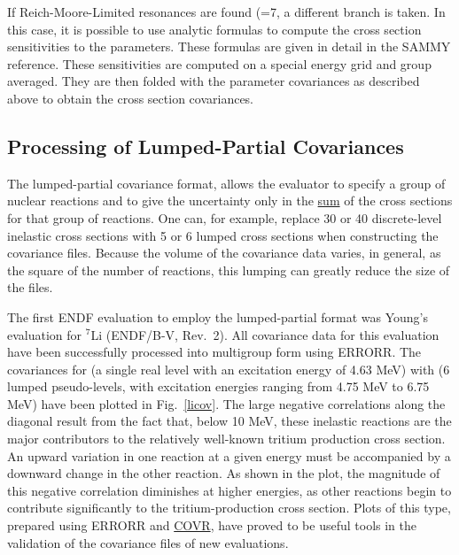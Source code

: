 If Reich-Moore-Limited resonances
are found (=7, a different branch is taken.  In this case,
it is possible to use analytic formulas to compute the cross section
sensitivities to the parameters.  These formulas are given in detail
in the SAMMY reference\cite{SAMMY}.  These sensitivities are computed
on a special energy grid and group averaged.  They are then folded
with the parameter covariances as described above to obtain the
cross section covariances.


\subsection{Processing of Lumped-Partial Covariances}
\label{ssERRORR_Lump}

The lumped-partial covariance format, allows the evaluator to
specify a group of nuclear reactions and to give the uncertainty only
in the \underline{sum} of the cross sections for that group of
reactions.  One can, for example, replace 30 or 40 discrete-level
inelastic cross sections with 5 or 6 lumped cross sections when
constructing the covariance files.  Because the volume of the
covariance data varies, in general, as the square of the number of
reactions, this lumping can greatly reduce the size of the files.

The first ENDF evaluation to employ the lumped-partial format was
Young's evaluation\cite{Young-2,Young} for $^7$Li (ENDF/B-V, Rev.~2).
All covariance data for this evaluation have been successfully
processed into multigroup form using ERRORR.  The covariances for
 (a single real level with an excitation energy of
4.63 MeV) with  (6 lumped pseudo-levels, with excitation
energies ranging from 4.75 MeV to 6.75 MeV) have been plotted in
Fig.~\ref{licov}.  The large negative correlations along the diagonal
result from the fact that, below 10 MeV, these inelastic reactions are
the major contributors to the relatively well-known tritium production
cross section.  An upward variation in one reaction at a given energy
must be accompanied by a downward change in the other reaction.  As shown
in the plot, the magnitude of this negative correlation diminishes at
higher energies, as other reactions begin to contribute significantly to
the tritium-production cross section.  Plots of this type, prepared using
ERRORR and \hyperlink{sCOVRhy}{COVR}, have proved to be
useful tools in the validation of
the covariance files of new evaluations\cite{LaBauve}.

